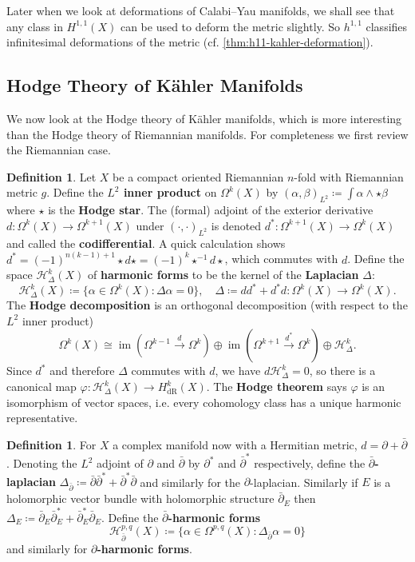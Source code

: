 \documentclass{report}
\theoremstyle{plain}
\theoremstyle{definition}
\newtheorem{definition}[theorem]{Definition}
\theoremstyle{remark}
\newcommand{\di}{\partial}
\newcommand{\cH}{\mathcal{H}}
\DeclareMathOperator{\im}{im}
\newcommand{\dR}{\mathrm{dR}}
\newcommand{\bdi}{\bar{\di}}
\begin{document}
Later when we look at deformations of Calabi--Yau manifolds, we shall
see that any class in $H^{1,1}(X)$ can be used to deform the metric
slightly. So $h^{1,1}$ classifies infinitesimal deformations of the
metric (cf. \ref{thm:h11-kahler-deformation}).

\subsection{Hodge Theory of K\"ahler Manifolds}

We now look at the Hodge theory of K\"ahler manifolds, which is more
interesting than the Hodge theory of Riemannian manifolds. For
completeness we first review the Riemannian case.

\begin{definition}
  Let $X$ be a compact oriented Riemannian $n$-fold with Riemannian
  metric $g$. Define the {\bf $L^2$ inner product} on $\Omega^k(X)$ by
  $(\alpha, \beta)_{L^2} \coloneqq \int \alpha \wedge \star \beta$
  where $\star$ is the {\bf Hodge star}. The (formal) adjoint of the
  exterior derivative $d\colon \Omega^k(X) \to \Omega^{k+1}(X)$ under
  $(\cdot, \cdot)_{L^2}$ is denoted $d^*\colon \Omega^{k+1}(X) \to
  \Omega^k(X)$ and called the {\bf codifferential}. A quick
  calculation shows $d^* = (-1)^{n(k-1)+1}\star d \star = (-1)^k
  \star^{-1} d \star$, which commutes with $d$. Define the space
  $\cH^k_\Delta(X)$ of {\bf harmonic forms} to be the kernel of the
       {\bf Laplacian} $\Delta$:
  \[ \cH^k_\Delta(X) \coloneqq \{\alpha \in \Omega^k(X) : \Delta \alpha = 0\}, \quad \Delta \coloneqq dd^* + d^*d\colon \Omega^k(X) \to \Omega^k(X). \]
  The {\bf Hodge decomposition} is an orthogonal decomposition (with
  respect to the $L^2$ inner product)
  \[ \Omega^k(X) \cong \im(\Omega^{k-1} \xrightarrow{d} \Omega^k) \oplus \im(\Omega^{k+1} \xrightarrow{d^*} \Omega^k) \oplus \cH^k_{\Delta}. \]
  Since $d^*$ and therefore $\Delta$ commutes with $d$, we have
  $d\cH^k_\Delta = 0$, so there is a canonical map $\varphi\colon
  \cH^k_\Delta(X) \to H^k_{\dR}(X)$. The {\bf Hodge theorem} says
  $\varphi$ is an isomorphism of vector spaces, i.e. every cohomology
  class has a unique harmonic representative.
\end{definition}

\begin{definition}
  For $X$ a complex manifold now with a Hermitian metric, $d = \di +
  \bdi$. Denoting the $L^2$ adjoint of $\di$ and $\bdi$ by $\di^*$ and
  $\bdi^*$ respectively, define the {\bf $\bdi$-laplacian}
  $\Delta_{\bdi} \coloneqq \bdi \bdi^* + \bdi^* \bdi$ and similarly
  for the $\di$-laplacian. Similarly if $E$ is a holomorphic vector
  bundle with holomorphic structure $\bdi_E$ then $\Delta_E \coloneqq
  \bdi_E \bdi_E^* + \bdi_E^* \bdi_E$. Define the {\bf $\bdi$-harmonic
    forms}
  \[ \cH^{p,q}_{\bdi}(X) \coloneqq \{\alpha \in \Omega^{p,q}(X) : \Delta_{\bdi}\alpha = 0\} \]
  and similarly for {\bf $\di$-harmonic forms}.
\end{definition}
\end{document}
